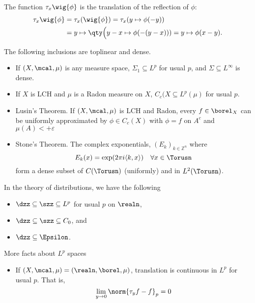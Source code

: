 \documentclass[../main-v2-manifolds.tex]{subfiles}
\begin{document}
\begin{remark}
    The function $\tau_x\wig{\phi}$ is the translation of the reflection of $\phi$:
    \begin{align*}
        \tau_x\wig{\phi} &= \tau_x(\wig{\phi}) = \tau_x(y\mapsto \phi(-y)) \\
        &= y\mapsto \qty\Big(y-x\mapsto \phi(-(y-x))) = y\mapsto \phi(x-y).
    \end{align*}
\end{remark}

\begin{lemma}
    The following inclusions are toplinear and dense.
    \begin{itemize}
        \item If $(X,\mcal,\mu)$ is any measure space, $\Sigma_1\subseteq L^p$ for usual $p$, and $\Sigma\subseteq L^\infty$ is dense.
        \item If $X$ is LCH and $\mu$ is a Radon measure on $X$, $C_c(X\subseteq L^p(\mu)$ for usual $p$.
        \item Lusin's Theorem. If $(X,\mcal,\mu)$ is LCH and Radon, every $f\in\borel_X$ can be uniformly approximated by $\phi\in C_c(X)$ with $\phi=f$ on $A^c$ and $\mu(A)<+\varepsilon$
        \item Stone's Theorem. The complex exponentials, $(E_k)_{k\in\mathbb{Z}^n}$ where
        \[
            E_k(x) = \exp(2\pi i\langle k,x\rangle)\quad\forall x\in\Torusn
        \]
        form a dense subset of $C(\Torusn)$ (uniformly) and in $L^2(\Torusn)$.
    \end{itemize}
    In the theory of distributions, we have the following
    \begin{itemize}
        \item $\dzz\subseteq\szz\subseteq L^p$ for usual $p$ on $\realn$, 
        \item $\dzz\subseteq\szz\subseteq C_0$, and
        \item $\dzz\subseteq\Epsilon$.
    \end{itemize}
\end{lemma}
More facts about $L^p$ spaces
\begin{itemize}
    \item If $(X,\mcal,\mu) = (\realn,\borel,\mu)$, translation is continuous in $L^p$ for usual $p$. That is,
    \[
        \lim_{y\to 0}\norm{\tau_y f-f}_p = 0
    \]
\end{itemize}

\end{document}

